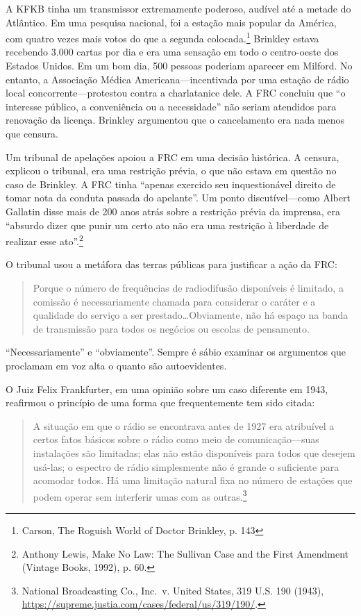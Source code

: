 \documentclass{book}
\begin{document}
A KFKB tinha um transmissor extremamente poderoso, audível até a metade do Atlântico.
Em uma pesquisa nacional, foi a estação mais popular da América, com quatro vezes
mais votos do que a segunda colocada.\footnote{Carson, The Roguish World of Doctor
Brinkley, p. 143} Brinkley estava recebendo 3.000 cartas por dia e era uma sensação
em todo o centro-oeste dos Estados Unidos. Em um bom dia, 500 pessoas poderiam
aparecer em Milford. No entanto, a Associação Médica Americana---incentivada por
uma estação de rádio local concorrente---protestou contra a charlatanice dele. A
FRC concluiu que ``o interesse público, a conveniência ou a necessidade'' não
seriam atendidos para renovação da licença. Brinkley argumentou que o cancelamento
era nada menos que censura.

Um tribunal de apelações apoiou a FRC em uma decisão histórica. A censura, explicou
o tribunal, era uma restrição prévia, o que não estava em questão no caso de
Brinkley. A FRC tinha ``apenas exercido seu inquestionável direito de tomar nota
da conduta passada do apelante''. Um ponto discutível---como Albert Gallatin disse
mais de 200 anos atrás sobre a restrição prévia da imprensa, era ``absurdo dizer
que punir um certo ato não era uma restrição à liberdade de realizar esse ato''.\footnote{Anthony
Lewis, Make No Law: The Sullivan Case and the First Amendment (Vintage Books,
1992), p. 60.}

O tribunal usou a metáfora das terras públicas para justificar a ação da FRC:\@

\begin{quote}
    Porque o número de frequências de radiodifusão disponíveis é limitado, a
    comissão é necessariamente chamada para considerar o caráter e a qualidade do
    serviço a ser prestado\ldots Obviamente, não há espaço na banda de transmissão
    para todos os negócios ou escolas de pensamento.
\end{quote}

``Necessariamente'' e ``obviamente''. Sempre é sábio examinar os argumentos que
proclamam em voz alta o quanto são autoevidentes.

O Juiz Felix Frankfurter, em uma opinião sobre um caso diferente em 1943, reafirmou
o princípio de uma forma que frequentemente tem sido citada:

\begin{quote}
    A situação em que o rádio se encontrava antes de 1927 era atribuível a certos
    fatos básicos sobre o rádio como meio de comunicação---suas instalações são
    limitadas; elas não estão disponíveis para todos que desejem usá-las; o
    espectro de rádio simplesmente não é grande o suficiente para acomodar todos.
    Há uma limitação natural fixa no número de estações que podem operar sem
    interferir umas com as outras.\footnote{National Broadcasting Co., Inc.~v.
    United States, 319 U.S. 190 (1943),
    \url{https://supreme.justia.com/cases/federal/us/319/190/}.}
\end{quote}
\end{document}
